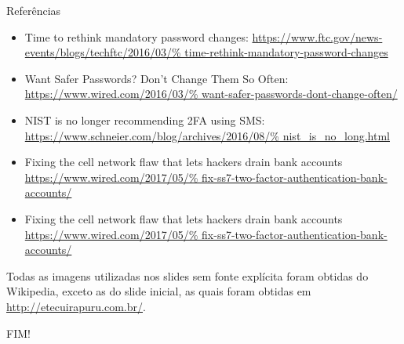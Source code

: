 \documentclass[utf8]{beamer}
\begin{document}
\begin{frame}{Referências}
  \fontsize{11pt}{11pt}\selectfont
  \begin{itemize}
    \item Time to rethink mandatory password changes:
          \url{https://www.ftc.gov/news-events/blogs/techftc/2016/03/%
               time-rethink-mandatory-password-changes}
    \item Want Safer Passwords? Don't Change Them So Often:
          \url{https://www.wired.com/2016/03/%
               want-safer-passwords-dont-change-often/}
    \item NIST is no longer recommending 2FA using SMS:
          \url{https://www.schneier.com/blog/archives/2016/08/%
               nist_is_no_long.html}
    \item Fixing the cell network flaw
          that lets hackers drain bank accounts
          \url{https://www.wired.com/2017/05/%
               fix-ss7-two-factor-authentication-bank-accounts/}
    \item Fixing the cell network flaw
          that lets hackers drain bank accounts
          \url{https://www.wired.com/2017/05/%
               fix-ss7-two-factor-authentication-bank-accounts/}
  \end{itemize}
  Todas as imagens utilizadas nos slides sem fonte explícita
  foram obtidas do Wikipedia,
  exceto as do slide inicial,
  as quais foram obtidas em \url{http://etecuirapuru.com.br/}.
\end{frame}


\begin{frame}
  \begin{center}\fontsize{5cm}{2.5cm}\selectfont
    FIM!
  \end{center}
\end{frame}
\end{document}
